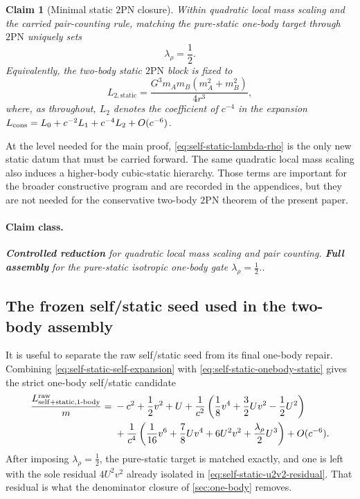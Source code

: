 \documentclass[11pt]{article}
\newcommand{\TwoPN}{\mathrm{2PN}}
\newcommand{\Controlled}{\textbf{Controlled reduction}}
\newcommand{\FullMatch}{\textbf{Full assembly}}
\newcommand{\claimclass}[1]{\paragraph{Claim class.}\emph{#1.}}
\newtheorem{claim}{Claim}
\begin{document}
\begin{claim}[Minimal static \texorpdfstring{$2$}{2}PN closure]
\label{clm:self-static-lambda-rho}
Within quadratic local mass scaling and the carried pair-counting rule,
matching the pure-static one-body target through \(\TwoPN\) uniquely sets
\begin{equation}
\lambda_\rho=\frac12.
\label{eq:self-static-lambda-rho-claim}
\end{equation}
Equivalently, the two-body static \(\TwoPN\) block is fixed to
\begin{equation}
L_{2,\mathrm{static}}
=\frac{G^3m_A m_B(m_A^2+m_B^2)}{4r^3},
\label{eq:self-static-L2static}
\end{equation}
where, as throughout, \(L_2\) denotes the coefficient of \(c^{-4}\) in the expansion
\(L_{\rm cons}=L_0+c^{-2}L_1+c^{-4}L_2+O(c^{-6})\).
\end{claim}

At the level needed for the main proof, \cref{eq:self-static-lambda-rho} is the only
new static datum that must be carried forward.  The same quadratic local mass scaling
also induces a higher-body cubic-static hierarchy.  Those terms are important for the
broader constructive program and are recorded in the appendices, but they are not needed
for the conservative two-body \(\TwoPN\) theorem of the present paper.

\claimclass{\Controlled{} for quadratic local mass scaling and pair counting.
\FullMatch{} for the pure-static isotropic one-body gate
\(\lambda_\rho=\frac12\).}

\subsection{The frozen self/static seed used in the two-body assembly}
\label{sec:self-static-seed}

It is useful to separate the raw self/static seed from its final one-body repair.
Combining \cref{eq:self-static-self-expansion} with
\cref{eq:self-static-onebody-static} gives the strict one-body self/static candidate
\begin{align}
\frac{L^{\rm raw}_{\mathrm{self}+\mathrm{static},1\text{-}\mathrm{body}}}{m}
={}&-c^2+\frac12 v^2+U
+\frac{1}{c^2}\left(\frac18 v^4+\frac32 Uv^2-\frac12 U^2\right)
\nonumber\\
&
+\frac{1}{c^4}\left(\frac1{16}v^6+\frac78 Uv^4+6U^2v^2+\frac{\lambda_\rho}{2}U^3\right)
+O(c^{-6}).
\label{eq:self-static-raw-onebody}
\end{align}
After imposing \(\lambda_\rho=\frac12\), the pure-static target is matched exactly, and
one is left with the sole residual \(4U^2v^2\) already isolated in
\cref{eq:self-static-u2v2-residual}.  That residual is what the denominator closure of
\cref{sec:one-body} removes.
\end{document}
